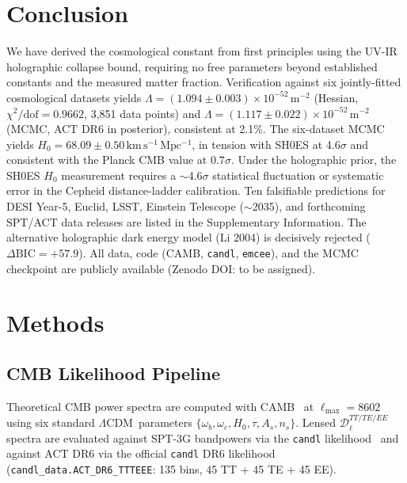 \documentclass[12pt,a4paper]{article}
\newcommand{\lcdm}{$\Lambda$CDM}
\newcommand{\kms}{\,\mathrm{km\,s^{-1}\,Mpc^{-1}}}
\newcommand{\msq}{\,\mathrm{m}^{-2}}
\begin{document}
\section{Conclusion}

We have derived the cosmological constant from first principles using the
UV-IR holographic collapse bound, requiring no free parameters beyond
established constants and the measured matter fraction.
Verification against six jointly-fitted cosmological datasets yields
$\Lambda = (1.094 \pm 0.003)\times 10^{-52}\msq$ (Hessian,
$\chi^2/\mathrm{dof} = 0.9662$, 3,851 data points) and
$\Lambda = (1.117 \pm 0.022)\times 10^{-52}\msq$ (MCMC, ACT DR6 in posterior),
consistent at 2.1\%.
The six-dataset MCMC yields $H_0 = 68.09 \pm 0.50\kms$,
in tension with SH0ES at 4.6$\sigma$ and consistent with the Planck CMB value
at $0.7\sigma$.
Under the holographic prior, the SH0ES $H_0$ measurement requires a
$\sim$4.6$\sigma$ statistical fluctuation or systematic error
in the Cepheid distance-ladder calibration.
Ten falsifiable predictions for DESI Year-5, Euclid, LSST,
Einstein Telescope ($\sim$2035), and forthcoming SPT/ACT data releases
are listed in the Supplementary Information.
The alternative holographic dark energy model (Li 2004) is decisively
rejected ($\Delta\mathrm{BIC} = +57.9$).
All data, code (CAMB, \texttt{candl}, \texttt{emcee}), and the MCMC
checkpoint are publicly available (Zenodo DOI: to be assigned).

\section*{Methods}

\subsection*{CMB Likelihood Pipeline}

Theoretical CMB power spectra are computed with CAMB~\cite{Lewis2000}
at $\ell_\mathrm{max} = 8602$ using six standard \lcdm\ parameters
$\{\omega_b, \omega_c, H_0, \tau, A_s, n_s\}$.
Lensed $\mathcal{D}_\ell^{TT/TE/EE}$ spectra are evaluated against
SPT-3G bandpowers via the \texttt{candl} likelihood~\cite{Camphuis2025}
and against ACT DR6 via the official \texttt{candl} DR6 likelihood
(\texttt{candl\_data.ACT\_DR6\_TTTEEE}: 135 bins, 45 TT + 45 TE + 45 EE).
\end{document}
